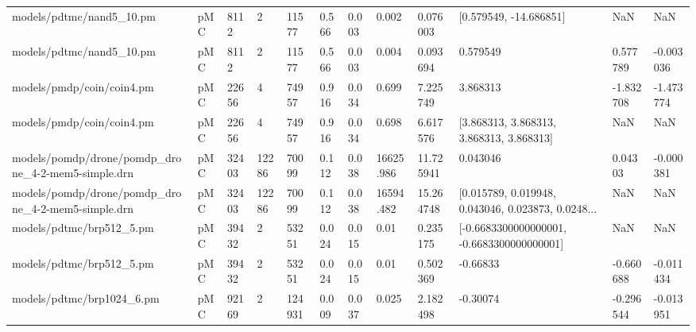 \begin{tabular}{llllllllllll}
                          models/pdtmc/nand5\_10.pm &  pMC &   8112 &          2 &       11577 &          0.566 &            0.003 &                        0.002 &       0.076003 &                             [0.579549, -14.686851] &                NaN &          NaN \\
                          models/pdtmc/nand5\_10.pm &  pMC &   8112 &          2 &       11577 &          0.566 &            0.003 &                        0.004 &       0.093694 &                                           0.579549 &           0.577789 &    -0.003036 \\
                         models/pmdp/coin/coin4.pm &  pMC &  22656 &          4 &       74957 &          0.916 &            0.034 &                        0.699 &       7.225749 &                                           3.868313 &          -1.832708 &    -1.473774 \\
                         models/pmdp/coin/coin4.pm &  pMC &  22656 &          4 &       74957 &          0.916 &            0.034 &                        0.698 &       6.617576 &           [3.868313, 3.868313, 3.868313, 3.868313] &                NaN &          NaN \\
models/pomdp/drone/pomdp\_drone\_4-2-mem5-simple.drn &  pMC &  32403 &      12286 &       70099 &          0.112 &            0.038 &                    16625.986 &      11.725941 &                                           0.043046 &            0.04303 &    -0.000381 \\
models/pomdp/drone/pomdp\_drone\_4-2-mem5-simple.drn &  pMC &  32403 &      12286 &       70099 &          0.112 &            0.038 &                    16594.482 &      15.264748 & [0.015789, 0.019948, 0.043046, 0.023873, 0.0248... &                NaN &          NaN \\
                          models/pdtmc/brp512\_5.pm &  pMC &  39432 &          2 &       53251 &          0.024 &            0.015 &                         0.01 &       0.235175 &         [-0.6683300000000001, -0.6683300000000001] &                NaN &          NaN \\
                          models/pdtmc/brp512\_5.pm &  pMC &  39432 &          2 &       53251 &          0.024 &            0.015 &                         0.01 &       0.502369 &                                           -0.66833 &          -0.660688 &    -0.011434 \\
                         models/pdtmc/brp1024\_6.pm &  pMC &  92169 &          2 &      124931 &          0.009 &            0.037 &                        0.025 &       2.182498 &                                           -0.30074 &          -0.296544 &    -0.013951 \\

\end{tabular}
